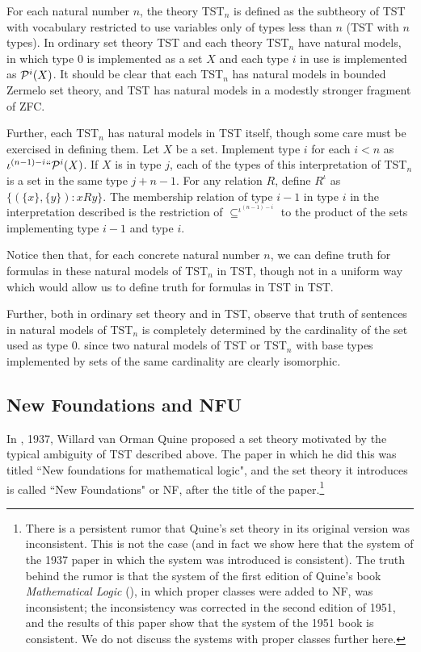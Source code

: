 \documentclass[112pt]{article}
\begin{document}
For each natural number $n$, the theory TST$_n$ is defined as the subtheory of TST with vocabulary restricted to use variables only of types less than $n$ (TST with $n$ types).
In ordinary set theory TST and each theory TST$_n$ have natural models, in which type 0 is implemented as a set $X$ and each type $i$ in use is implemented as ${\cal P}^i(X)$.  It should be clear that each TST$_n$ has natural models in bounded Zermelo set theory, and TST has natural models in a modestly stronger fragment of ZFC.

Further, each TST$_n$ has natural models in TST itself, though some care must be exercised in defining them.  Let $X$ be a set.  Implement type $i$ for each $i<n$ as
$\iota^{(n-1)-i}``{\cal P}^i(X)$.  If $X$ is in type $j$, each of the types of this interpretation of TST$_n$ is a set in the same type $j+n-1$.  For any relation $R$, define
$R^{\iota}$ as $\{(\{x\},\{y\}):x R y\}$.  The membership relation of type $i-1$ in type $i$ in the interpretation described is the restriction of $\subseteq^{\iota^{(n-1)-i}}$ to
the product of the sets implementing type $i-1$ and type $i$.

Notice then that, for each concrete natural number $n$, we can define truth for formulas in these natural models of TST$_n$  in TST, though not in a uniform way which would allow us to define truth for formulas
in TST in TST.

Further, both in ordinary set theory and in TST, observe that truth of sentences in natural models of TST$_n$ is completely determined by the cardinality of the set used as type 0.
since two natural models of TST or TST$_n$ with base types implemented by sets of the same cardinality are clearly isomorphic. 

\newpage

\subsection{New Foundations and NFU}

In \cite{nf}, 1937, Willard van Orman Quine proposed a set theory motivated by the typical ambiguity of TST described above.  The paper in which he did this was titled ``New foundations for mathematical logic", and the set theory it introduces is called ``New Foundations" or NF, after the title of the paper.\footnote{There is a persistent rumor that Quine's set theory in its original version was inconsistent.  This is not the case (and in fact we show here that the system of the 1937 paper in which the system was introduced is consistent).  The truth behind the rumor is that the system of the first edition of Quine's book {\em Mathematical Logic\/} (\cite{ml}), in which proper classes were added to NF, was inconsistent;  the inconsistency was corrected in the second edition of 1951, and the results of this paper show that the system of the 1951 book is consistent.  We do not discuss the systems with proper classes further here.}
\end{document}
